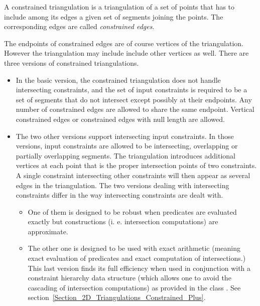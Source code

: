 A constrained triangulation is a triangulation of a set of points
that has to include among its edges 
a given set of segments joining the points. The corresponding 
edges are called {\em constrained edges}. 

The endpoints of constrained edges are of course vertices of the
triangulation. However the triangulation may include
include other vertices as well.
There are three versions of  constrained triangulations.
\begin{itemize}
\item
In the basic version, the constrained triangulation 
does not handle intersecting constraints, and the set of input 
constraints is required to be a set of segments that do not intersect
except possibly at their endpoints. Any number of constrained edges
are allowed to share the same endpoint.  Vertical constrained edges or
constrained edges with null length are allowed.
\item 
The two other versions support intersecting input constraints.
In those versions, input constraints are allowed to be
intersecting, overlapping or partially
overlapping segments.
The triangulation introduces  additional  vertices at each point that
is the proper intersection points of  two 
constraints. A single constraint intersecting other
constraints will then appear as several edges in the triangulation.
The two versions dealing with intersecting constraints differ
in the way intersecting constraints are dealt with.
\begin{itemize}
\item
 One of them is
designed to be robust when predicates are evaluated exactly but
constructions (i. e.  intersection computations) are
approximate.
\item
The other one is designed to be used 
with exact arithmetic (meaning exact
evaluation of predicates and exact computation of intersections.)
This last version finds its full efficiency  when used in conjunction
with a constraint hierarchy data structure (which allows one to avoid the
cascading of intersection computations)
as provided in the class
. See
section~\ref{Section_2D_Triangulations_Constrained_Plus}.
\end{itemize}
\end{itemize}


